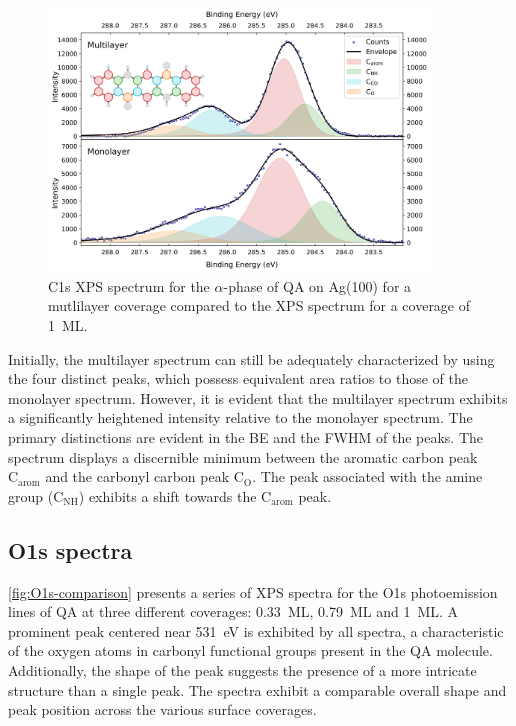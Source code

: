 \begin{figure}[H]
	\centering
	\includegraphics[width=0.9\textwidth]{images/C1s-multilayer.png}
	\caption{C1s \ac{XPS} spectrum for the $\alpha$-phase of \ac{QA} on Ag(100) for a mutlilayer coverage compared to the \ac{XPS} spectrum for a coverage of 1~\ac{ML}.}
	\label{fig:C1s-alpha-multilayer}
\end{figure}

Initially, the multilayer spectrum can still be adequately characterized by using the four distinct peaks, which possess equivalent area ratios to those of the monolayer spectrum. However, it is evident that the multilayer spectrum exhibits a significantly heightened intensity relative to the monolayer spectrum. The primary distinctions are evident in the \ac{BE} and the \ac{FWHM} of the peaks. The spectrum displays a discernible minimum between the aromatic carbon peak $\mathrm{C_{arom}}$ and the carbonyl carbon peak $\mathrm{C_{O}}$. The peak associated with the amine group ($\mathrm{C_{NH}}$) exhibits a shift towards the $\mathrm{C_{arom}}$ peak.


\cleardoublepage
\subsection{O1s spectra}

\autoref{fig:O1s-comparison} presents a series of \ac{XPS} spectra for the O1s photoemission lines of \ac{QA} at three different coverages: 0.33~\ac{ML}, 0.79~\ac{ML} and 1~\ac{ML}. A prominent peak centered near 531~\si{\eV} is exhibited by all spectra, a characteristic of the oxygen atoms in carbonyl functional groups present in the \ac{QA} molecule. Additionally, the shape of the peak suggests the presence of a more intricate structure than a single peak. The spectra exhibit a comparable overall shape and peak position across the various surface coverages.

